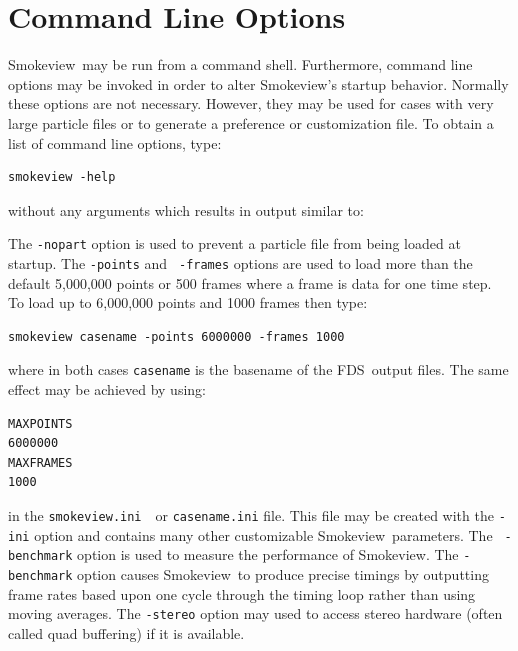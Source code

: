 \documentclass[11pt,twoside]{book}
\newcommand{\svini}{{\tt smokeview.ini}\ }
\newcommand{\fds}{{FDS}}
\newcommand{\Smokeview}{{Smokeview}}
\newcommand{\smokeview}{{Smokeview}}
\begin{document}

\chapter{Command Line Options}
\label{sectioncommand} \Smokeview\ may be run from a command
shell.  Furthermore, command line options may be invoked in order
to alter \smokeview's startup behavior. Normally these options are
not necessary.  However, they may be used for cases with very
large particle files or to generate a preference or customization
file. To obtain a list of command line options, type:
\begin{verbatim}
smokeview -help
\end{verbatim}
\noindent without any arguments which results in output similar to:\\

{
\scriptsize

}

\noindent The {\tt -nopart} option is used to prevent a particle
file from being loaded at startup. The {\tt -points} and {\tt
-frames} options are used to load more than the default 5,000,000
points or 500 frames where a frame is data for one time step. To
load up to 6,000,000 points and 1000 frames then type:
\begin{verbatim}
smokeview casename -points 6000000 -frames 1000
\end{verbatim}
\noindent where in both cases {\tt casename} is the basename of
the \fds\ output files. The same effect may be achieved by using:
\begin{verbatim}
MAXPOINTS
6000000
MAXFRAMES
1000
\end{verbatim}
\noindent in the \svini\ or {\tt casename.ini} file.
This file may be created with the {\tt -ini} option and contains
many other customizable \smokeview\ parameters. The {\tt
-benchmark} option is used to measure the performance of
\smokeview. The {\tt -benchmark} option causes \smokeview\ to
produce precise timings by outputting frame rates based upon one
cycle through the timing loop rather than using moving averages.
The {\tt -stereo} option may used to access stereo hardware (often
called quad buffering) if it is available.

\end{document}
